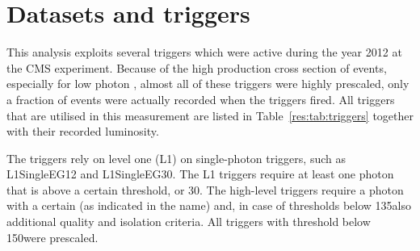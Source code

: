\section{Datasets and triggers}
\label{res:sec:DatasetsAndTriggers}
This analysis exploits several triggers which were active during the year 2012 at the CMS experiment.
Because of the high production cross section of \GAMJET events, especially for low photon \pt, almost all of these triggers were highly prescaled, \ie only a fraction of events were actually recorded when the triggers fired.
All triggers that are utilised in this measurement are listed in Table~\ref{res:tab:triggers} together with their recorded luminosity.
\renewcommand{\arraystretch}{1.5}
\begin{table}[!b]
\centering
\caption{Single-photon triggers together with the recorded luminosity taking the prescales of the triggers into consideration.}
\label{res:tab:triggers}
\end{table}  
The triggers rely on level one (L1) on single-photon triggers, such as L1SingleEG12 and L1SingleEG30.
The L1 triggers require at least one photon that is above a certain \pt threshold, \gev or 30\gev.
The high-level triggers require a photon with a certain \pt (as indicated in the name) and, in case of thresholds below 135\gev also additional quality and isolation criteria. 
All triggers with threshold below 150\gev were prescaled.

